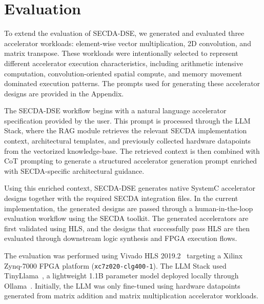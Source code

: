 
\section{Evaluation}
\label{04_Results&Evaluation}

To extend the evaluation of SECDA-DSE, we generated and evaluated three accelerator workloads: element-wise vector multiplication, 2D convolution, and matrix transpose. These workloads were intentionally selected to represent different accelerator execution characteristics, including arithmetic intensive computation, convolution-oriented spatial compute, and memory movement dominated execution patterns. The prompts used for generating these accelerator designs are provided in the Appendix. %

The SECDA-DSE workflow begins with a natural language accelerator specification provided by the user. This prompt is processed through the LLM Stack, where the RAG module retrieves the relevant SECDA implementation context, architectural templates, and previously collected hardware datapoints from the vectorized knowledge-base. The retrieved context is then combined with CoT prompting to generate a structured accelerator generation prompt enriched with SECDA-specific architectural guidance.

Using this enriched context, SECDA-DSE generates native SystemC accelerator designs together with the required SECDA integration files. In the current implementation, the generated designs are passed through a human-in-the-loop evaluation workflow using the SECDA toolkit. The generated accelerators are first validated using HLS, and the designs that successfully pass HLS are then evaluated through downstream logic synthesis and FPGA execution flows.

The evaluation was performed using Vivado HLS 2019.2~\cite{vivadohls2019_2} targeting a Xilinx Zynq-7000 FPGA platform (\texttt{xc7z020-clg400-1}). The LLM Stack used TinyLlama~\cite{zhang2024tinyllama}, a lightweight 1.1B parameter model deployed locally through Ollama~\cite{ollama}. Initially, the LLM was only fine-tuned using hardware datapoints generated from matrix addition and matrix multiplication accelerator workloads.

